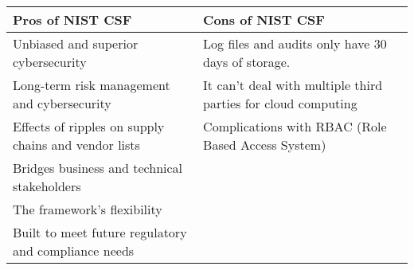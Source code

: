 \begin{table}[!h]
          \centering
          \caption{\cite{securityboulevardNISTWhat}}
          \begin{tabular}{|p{8.5cm}|p{8.5cm}|}
          \hline
                    \raggedright Pros of NIST CSF & Cons of NIST CSF \\ \hline
                    Unbiased and superior cybersecurity & Log files and audits only have 30 days of storage. \\ \hline
                    Long-term risk management and cybersecurity & It can't deal with multiple third parties for cloud computing \\ \hline
                    Effects of ripples on supply chains and vendor lists & Complications with RBAC (Role Based Access System) \\ \hline
                    Bridges business and technical stakeholders & \\ \hline
                    The framework's flexibility & \\ \hline
                    Built to meet future regulatory and compliance needs & \\ \hline
          \end{tabular}
          
\end{table}